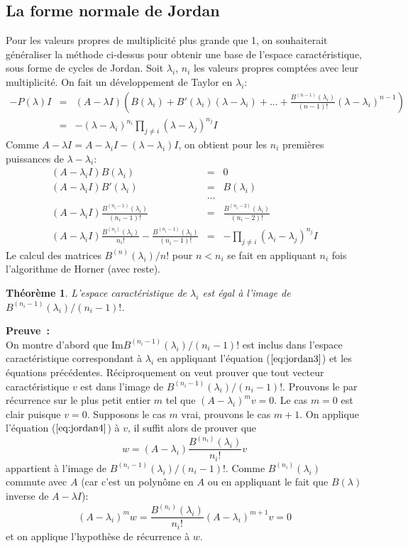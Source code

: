 \documentclass[a4paper,11pt]{book}
\newtheorem{thm}{Théorème}
\begin{document}
\begin{giacjshere}
\subsection{La forme normale de Jordan} \label{sec:jordan}
Pour les valeurs propres de multiplicit\'e plus grande que 1, on souhaiterait 
g\'en\'eraliser la m\'ethode ci-dessus pour obtenir une base
de l'espace caractéristique, sous forme de cycles de Jordan.
Soit $\lambda _i$, $n_i$ les valeurs propres compt\'ees avec leur 
multiplicit\'e. On fait un d\'eveloppement de Taylor en
$\lambda _i$:
\begin{eqnarray*} 
-P(\lambda )I&=&(A-\lambda I)\left(
B(\lambda_i )+ B'(\lambda _i)(\lambda -\lambda _i)
+ ... +  \frac{B^{(n-1)}(\lambda_i )}{(n-1)!} 
(\lambda -\lambda _i)^{n-1} \right) \\
&=& -(\lambda -\lambda _i)^{n_i}
\prod _{j\neq i} (\lambda -\lambda _j)^{n_j} I 
\end{eqnarray*}
Comme $A-\lambda I=A-\lambda _i I - (\lambda -\lambda _i)I$, on obtient
pour les $n_i$ premi\`eres puissances de $\lambda -\lambda _i$:
\begin{eqnarray} \label{eq:jordan1}
(A-\lambda _i I) B(\lambda _i)&=&0\\
(A-\lambda _i I) B'(\lambda _i)&=&B(\lambda_i )\\
& ... & \\
(A-\lambda _i I) \frac{B^{(n_i-1)}(\lambda _i)}{(n_i-1)!} &=& 
\frac{B^{(n_i-2)}(\lambda _i)}{(n_i-2)!} \label{eq:jordan3} \\
(A-\lambda _i I)\frac{B^{(n_i)}(\lambda_i)}{n_i!} -  
\frac{B^{(n_i-1)}(\lambda_i)}{(n_i-1)!}
&= &-\prod_{j\neq i}(\lambda _i-\lambda _j)^{n_j} I \label{eq:jordan4}
\end{eqnarray}
Le calcul des matrices $B^{(n)}(\lambda _i)/n!$ pour $n<n_i$ se fait en
appliquant $n_i$ fois l'algorithme de Horner (avec reste).

\begin{thm} \label{th:jordan}
L'espace caract\'eristique de $\lambda _i$ est égal à
l'image de $B^{(n_i-1)}(\lambda _i)/(n_i-1)!$.
\end{thm}
{\bf Preuve~:}\\
On montre d'abord que Im$B^{(n_i-1)}(\lambda _i)/(n_i-1)!$ est inclus
dans l'espace caractéristique correspondant à $\lambda_i$ en
appliquant l'\'equation (\(\ref{eq:jordan3}\)) et les \'equations précédentes.
Réciproquement on veut prouver que tout vecteur caract\'eristique $v$ est dans 
l'image de $B^{(n_i-1)}(\lambda _i)/(n_i-1)!$. Prouvons le par r\'ecurrence
sur le plus petit entier $m$ tel que
$(A-\lambda _i)^{m}v=0$. Le cas $m=0$ est clair puisque $v=0$.
Supposons le cas $m$ vrai, prouvons le cas $m+1$. On applique l'\'equation
(\(\ref{eq:jordan4}\)) \`a $v$, il suffit alors de prouver que
\[ w=(A-\lambda _i)\frac{B^{(n_i)}(\lambda_i)}{n_i!} v\]
appartient \`a l'image de
$B^{(n_i-1)}(\lambda _i)/(n_i-1)!$.
Comme $B^{(n_i)}(\lambda_i)$
commute avec $A$ (car c'est un polyn\^ome en $A$ ou en appliquant
le fait que $B(\lambda)$ inverse de $A-\lambda I$):
\[ (A-\lambda _i)^m w=\frac{B^{(n_i)}(\lambda_i)}{n_i!} 
(A-\lambda _i)^{m+1}v=0 \]
et on applique l'hypoth\`ese de r\'ecurrence \`a $w$.


\end{giacjshere}
\end{document}
